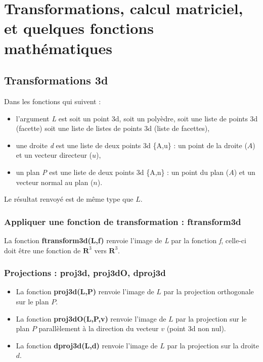\documentclass[%
10pt,%
a4paper,%
french,%
]%
{article}%
\begin{document}
\section{Transformations, calcul matriciel, et quelques fonctions mathématiques}

\subsection{Transformations 3d}

Dans les fonctions qui suivent :
\begin{itemize}
    \item l'argument \emph{L} est soit un point 3d, soit un polyèdre, soit une liste de points 3d (facette) soit une liste de listes de points 3d (liste de facettes),
    \item une droite \emph{d} est une liste de deux points 3d \{A,u\} : un point de la droite ($A$) et un vecteur directeur ($u$),
    \item un plan \emph{P} est une liste de deux points 3d \{A,n\} : un point du plan ($A$) et un vecteur normal au plan ($n$).
  \end{itemize}
Le résultat renvoyé est de même type que $L$.
  
\subsubsection{Appliquer une fonction de transformation : ftransform3d}

La fonction \textbf{ftransform3d(L,f)} renvoie l'image de \emph{L} par la fonction \emph{f}, celle-ci  doit être une fonction de $\mathbf R^3$ vers $\mathbf R^3$.

\subsubsection{Projections : proj3d, proj3dO, dproj3d}

\begin{itemize}
    \item La fonction \textbf{proj3d(L,P)} renvoie l'image de $L$ par la projection orthogonale sur le plan $P$.
    \item La fonction \textbf{proj3dO(L,P,v)} renvoie l'image de $L$ par la projection sur le plan $P$ parallèlement à la direction du vecteur $v$ (point 3d non nul).
    \item La fonction \textbf{dproj3d(L,d)} renvoie l'image de $L$ par la projection sur la droite $d$.
\end{itemize}
\end{document}
